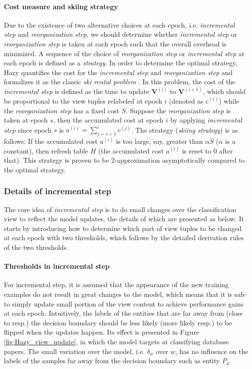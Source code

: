 \paragraph{Cost measure and skiing strategy} Due to the existence of two alternative choices at each epoch, i.e. {\em incremental step} and {\em reorganization step}, we should determine whether {\em incremental step} or {\em reorganization step} is taken at each epoch such that the overall overhead is minimized. A sequence of the choice of {\em reorganization step} or {\em incremental step} at each epoch is defined as a {\em strategy}. In order to determine the optimal strategy, Hazy quantifies the cost for the {\em incremental step} and {\em reorganization step} and formalizes it as the classic {\em ski rental problem} \cite{karlin1994competitive}. In this problem, the cost of the {\em incremental step} is defined as the time to update $\textbf{V}^{(i)}$ to $\textbf{V}^{(i+1)}$, which should be proportional to the view tuples relabeled at epoch $i$ (denoted as $c^{(i)}$) while the {\em reorganization step} has a fixed cost $S$. Suppose the {\em reorganization step} is taken at epoch $s$, then the accumulated cost at epoch $i$ by applying {\em incremental step} since epoch $s$ is $a^{(i)} = \sum_{j=s+1}^ic^{(j)}$. The strategy ({\em skiing strategy}) is as follows: If the accumulated cost $a^{(i)}$ is too large, say, greater than $\alpha S$ ($\alpha$ is a constant), then refresh table $H$ (the accumulated cost $a^{(i)}$ is reset to 0 after that). This strategy is proven to be 2-approximation asymptotically compared to the optimal strategy.


\subsubsection{Details of incremental step}\label{Sec: incremental step}
The core idea of {\em incremental step} is to do small changes over the classification view to reflect the model updates, the details of which are presented as below. It starts by introducing how to determine which part of view tuples to be changed at each epoch with two thresholds, which follows by the detailed derivation rules of the two thresholds.

\paragraph{Thresholds in incremental step}
For incremental step, it is assumed that the appearance of the new training examples do not result in great changes to the model, which means that it is safe to simply update small portion of the view content to achieve performance gains at each epoch. Intuitively, the labels of the entities that are far away from (close to resp.) the decision boundary should be less likely (more likely resp.) to be flipped when the updates happen. Its effect is presented in Figure \ref{fig:Hazy_view_update}, in which the model targets at classifying database papers. The small variation over the model, i.e. $\delta_w$ over $w$, has no influence on the labels of the samples far away from the decision boundary such as entity $P_4$.

